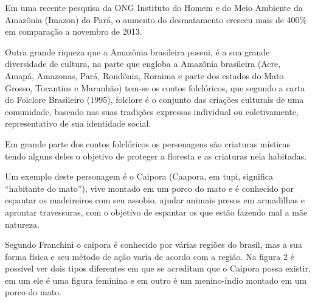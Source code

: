 Em uma recente pesquisa da ONG Instituto do Homem e do Meio Ambiente da Amazônia (Imazon) do Pará, o aumento do desmatamento cresceu mais de 400\% em comparação a novembro de 2013.

Outra grande riqueza que a Amazônia brasileira possui, é a sua grande diversidade de cultura, na parte que engloba a Amazônia brasileira (Acre, Amapá, Amazonas, Pará, Rondônia, Roraima e parte dos estados do Mato Grosso, Tocantins e Maranhão) tem-se os contos folclóricos, que segundo a carta do Folclore Brasileiro (1995), folclore é o conjunto das criações culturais de uma comunidade, baseado nas suas tradições expressas individual ou coletivamente, representativo de sua identidade social.

Em grande parte dos contos folclóricos os personagens são criaturas místicas tendo alguns deles o objetivo de proteger a floresta e as criaturas nela habitadas.


Um exemplo deste personagem é o Caipora (Caapora, em tupi, significa “habitante do mato”), vive montado em um porco do mato e é conhecido por espantar os madeireiros com seu assobio, ajudar animais presos em armadilhas e aprontar travessuras, com o objetivo de espantar os que estão fazendo mal a mãe natureza. 

Segundo Franchini o caipora é conhecido por várias regiões do brasil, mas a sua forma física e seu método de ação varia de acordo com a região.
Na figura 2 é possível ver dois tipos diferentes em que se acreditam que o Caipora possa existir, em um ele é uma figura feminina e em outro é um menino-índio montado em um porco do mato.

\begin{figure}[h!]
		\centering
	\end{figure}